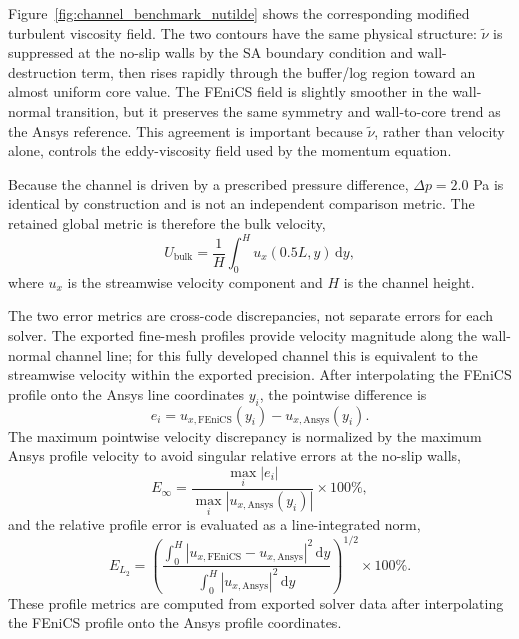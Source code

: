 Figure~\ref{fig:channel_benchmark_nutilde} shows the corresponding modified turbulent viscosity field. The two contours have the same physical structure: $\tilde{\nu}$ is suppressed at the no-slip walls by the SA boundary condition and wall-destruction term, then rises rapidly through the buffer/log region toward an almost uniform core value. The FEniCS field is slightly smoother in the wall-normal transition, but it preserves the same symmetry and wall-to-core trend as the Ansys reference. This agreement is important because $\tilde{\nu}$, rather than velocity alone, controls the eddy-viscosity field used by the momentum equation.

Because the channel is driven by a prescribed pressure difference, $\Delta p=2.0$ Pa is identical by construction and is not an independent comparison metric. The retained global metric is therefore the bulk velocity,
\begin{equation}
	U_{\mathrm{bulk}} = \frac{1}{H}\int_0^H u_x(0.5L,y)\,\mathrm{d}y,
\end{equation}
where $u_x$ is the streamwise velocity component and $H$ is the channel height.

The two error metrics are cross-code discrepancies, not separate errors for each solver. The exported fine-mesh profiles provide velocity magnitude along the wall-normal channel line; for this fully developed channel this is equivalent to the streamwise velocity within the exported precision. After interpolating the FEniCS profile onto the Ansys line coordinates $y_i$, the pointwise difference is
\begin{equation}
	e_i = u_{x,\mathrm{FEniCS}}(y_i)-u_{x,\mathrm{Ansys}}(y_i).
\end{equation}
The maximum pointwise velocity discrepancy is normalized by the maximum Ansys profile velocity to avoid singular relative errors at the no-slip walls,
\begin{equation}
	E_{\infty} =
	\frac{\max_i |e_i|}{\max_i |u_{x,\mathrm{Ansys}}(y_i)|}\times 100\%,
	\label{eq:channel_einf}
\end{equation}
and the relative profile error is evaluated as a line-integrated norm,
\begin{equation}
	E_{L_2} =
	\left(
	\frac{\int_0^H |u_{x,\mathrm{FEniCS}}-u_{x,\mathrm{Ansys}}|^2\,\mathrm{d}y}
	{\int_0^H |u_{x,\mathrm{Ansys}}|^2\,\mathrm{d}y}
	\right)^{1/2}\times 100\%.
	\label{eq:channel_el2}
\end{equation}
These profile metrics are computed from exported solver data after interpolating the FEniCS profile onto the Ansys profile coordinates.

